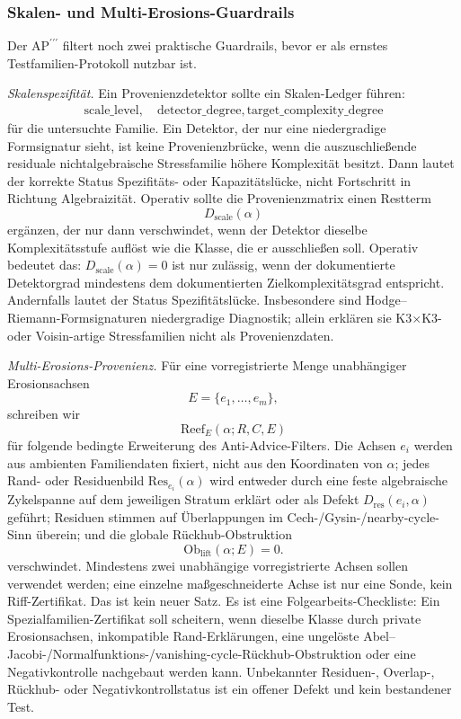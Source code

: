 \documentclass[aps,prd,twocolumn,superscriptaddress,nofootinbib]{revtex4-2}
\theoremstyle{definition}
\theoremstyle{remark}
\def\\{ }%
\begin{document}
\subsubsection*{Skalen- und Multi-Erosions-Guardrails}
\label{subsec:scale-reef}

Der $\mathrm{AP}^{\prime\prime\prime}$ filtert noch zwei praktische Guardrails, bevor er als ernstes Testfamilien-Protokoll nutzbar ist.

\emph{Skalenspezifität.} Ein Provenienzdetektor sollte ein Skalen-Ledger führen:
\[
\begin{gathered}
\mathrm{scale\_level},\quad \mathrm{detector\_degree},\\
\mathrm{target\_complexity\_degree}
\end{gathered}
\]
für die untersuchte Familie. Ein Detektor, der nur eine niedergradige Formsignatur sieht, ist keine Provenienzbrücke, wenn die auszuschließende residuale nichtalgebraische Stressfamilie höhere Komplexität besitzt. Dann lautet der korrekte Status Spezifitäts- oder Kapazitätslücke, nicht Fortschritt in Richtung Algebraizität. Operativ sollte die Provenienzmatrix einen Restterm
\[
D_{\mathrm{scale}}(\alpha)
\]
ergänzen, der nur dann verschwindet, wenn der Detektor dieselbe Komplexitätsstufe auflöst wie die Klasse, die er ausschließen soll.
Operativ bedeutet das: $D_{\mathrm{scale}}(\alpha)=0$ ist nur zulässig, wenn der dokumentierte Detektorgrad mindestens dem dokumentierten Zielkomplexitätsgrad entspricht. Andernfalls lautet der Status Spezifitätslücke. Insbesondere sind Hodge--Riemann-Formsignaturen niedergradige Diagnostik; allein erklären sie K3$\times$K3- oder Voisin-artige Stressfamilien nicht als Provenienzdaten.

\emph{Multi-Erosions-Provenienz.} Für eine vorregistrierte Menge unabhängiger Erosionsachsen
\[
E=\{e_1,\ldots,e_m\},
\]
schreiben wir
\[
\mathrm{Reef}_{E}(\alpha;R,C,E)
\]
für folgende bedingte Erweiterung des Anti-Advice-Filters. Die Achsen $e_i$ werden aus ambienten Familiendaten fixiert, nicht aus den Koordinaten von $\alpha$; jedes Rand- oder Residuenbild $\mathrm{Res}_{e_i}(\alpha)$ wird entweder durch eine feste algebraische Zykelspanne auf dem jeweiligen Stratum erklärt oder als Defekt $D_{\mathrm{res}}(e_i,\alpha)$ geführt; Residuen stimmen auf Überlappungen im Cech-/Gysin-/nearby-cycle-Sinn überein; und die globale Rückhub-Obstruktion
\[
\mathrm{Ob}_{\mathrm{lift}}(\alpha;E)=0.
\]
verschwindet. Mindestens zwei unabhängige vorregistrierte Achsen sollen verwendet werden; eine einzelne maßgeschneiderte Achse ist nur eine Sonde, kein Riff-Zertifikat. Das ist kein neuer Satz. Es ist eine Folgearbeits-Checkliste: Ein Spezialfamilien-Zertifikat soll scheitern, wenn dieselbe Klasse durch private Erosionsachsen, inkompatible Rand-Erklärungen, eine ungelöste Abel--Jacobi-/Normalfunktions-/vanishing-cycle-Rückhub-Obstruktion oder eine Negativkontrolle nachgebaut werden kann. Unbekannter Residuen-, Overlap-, Rückhub- oder Negativkontrollstatus ist ein offener Defekt und kein bestandener Test.
\end{document}

